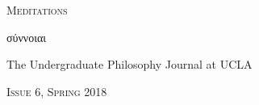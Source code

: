 \setlength{\tabcolsep}{1em}
\thispagestyle{empty}
\begin{center}

{\LARGE\scshape Meditations}

\vspace{1em}

{\large \textgreek{σύννοιαι}}

\vspace{1em}

{The Undergraduate Philosophy Journal at UCLA}

\vspace{1em}

{\selectfont \textsc{Issue} 6, \textsc{Spring} 2018}

\vspace{1em}

\hrulefill

\vspace{2em}


\end{center}
